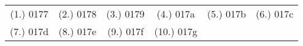 \begin{eocexercises}{}
\begin{enumerate}
\end{enumerate}



\par \practiceinfo
\par \begin{tabular}[h]{cccccc}
(1.)	0177	&
(2.)	0178	&
(3.)	0179	&
(4.)	017a	&
(5.)	017b	&
(6.)	017c	\\ %
(7.)	017d	&
(8.)	017e	&
(9.)	017f	&
(10.)	017g	&
\end{tabular}
\end{eocexercises} 




